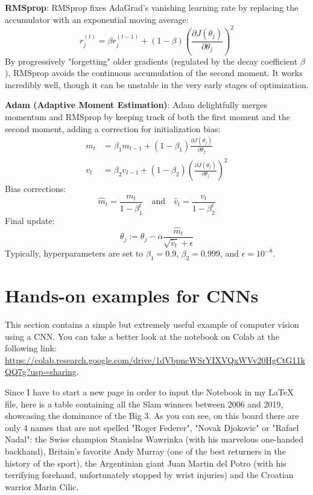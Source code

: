 \textbf{RMSprop}:
RMSprop fixes AdaGrad's vanishing learning rate by replacing the accumulator with an exponential moving average:
\begin{equation}
    r_j^{(t)} = \beta r_j^{(t-1)} + (1-\beta)\left(\frac{\partial J(\theta_j)}{\partial \theta_j}\right)^2
\end{equation}
By progressively "forgetting" older gradients (regulated by the decay coefficient $\beta$), RMSprop avoids the continuous accumulation of the second moment. It works incredibly well, though it can be unstable in the very early stages of optimization.

\textbf{Adam (Adaptive Moment Estimation)}:
Adam delightfully merges momentum and RMSprop by keeping track of both the first moment and the second moment, adding a correction for initialization bias:
\begin{align}
    m_t &= \beta_1 m_{t-1} + (1-\beta_1)\frac{\partial J(\theta_j)}{\partial \theta_j} \\
    v_t &= \beta_2 v_{t-1} + (1-\beta_2)\left(\frac{\partial J(\theta_j)}{\partial \theta_j}\right)^2
\end{align}
Bias corrections:
\begin{equation}
    \hat{m}_t = \frac{m_t}{1-\beta_1^t} \quad \text{and} \quad \hat{v}_t = \frac{v_t}{1-\beta_2^t}
\end{equation}
Final update:
\begin{equation}
    \theta_j := \theta_j - \alpha \frac{\hat{m}_t}{\sqrt{\hat{v}_t} + \epsilon}
\end{equation}
Typically, hyperparameters are set to $\beta_1 = 0.9$, $\beta_2 = 0.999$, and $\epsilon = 10^{-8}$.

\section{Hands-on examples for CNNs}

This section contains a simple but extremely useful example of computer vision using a CNN. You can take a better look at the notebook on Colab at the following link: \url{https://colab.research.google.com/drive/1dVbpncWSrYIXVQxWVv20HgCtG11kQQ7g?usp=sharing}.

Since I have to start a new page in order to input the Notebook in my LaTeX file, here is a table containing all the Slam winners between 2006 and 2019, showcasing the dominance of the Big 3. As you can see, on this board there are only 4 names that are not spelled "Roger Federer", "Novak Djokovic" or "Rafael Nadal": the Swiss champion Stanislas Wawrinka (with his marvelous one-handed backhand), Britain's favorite Andy Murray (one of the best returners in the history of the sport), the Argentinian giant Juan Martin del Potro (with his terrifying forehand, unfortunately stopped by wrist injuries) and the Croatian warrior Marin Cilic.  

